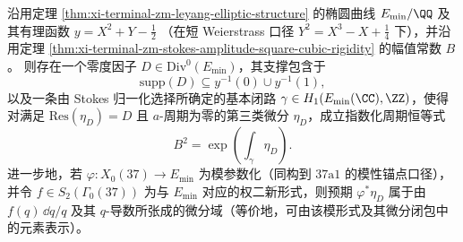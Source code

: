 
\begin{conjecture}\label{conj:xi-terminal-zm-stokes-b2-thirdkind-exponential-period}
沿用定理 \ref{thm:xi-terminal-zm-leyang-elliptic-structure} 的椭圆曲线 \(E_{\min}/\QQ\) 及其有理函数
\(
y= X^{2}+Y-\tfrac12
\)
（在短 Weierstrass 口径 \(Y^{2}=X^{3}-X+\tfrac14\) 下），并沿用定理 \ref{thm:xi-terminal-zm-stokes-amplitude-square-cubic-rigidity} 的幅值常数 \(B\)。
则存在一个零度因子 \(D\in\mathrm{Div}^{0}(E_{\min})\)，其支撑包含于
\[
\mathrm{supp}(D)\subseteq y^{-1}(0)\cup y^{-1}(1),
\]
以及一条由 Stokes 归一化选择所确定的基本闭路 \(\gamma\in H_{1}(E_{\min}(\CC),\ZZ)\)，使得对满足
\(
\mathrm{Res}(\eta_D)=D
\)
且 \(a\)-周期为零的第三类微分 \(\eta_D\)，成立指数化周期恒等式
\[
\boxed{\;
B^{2}=\exp\!\left(\int_{\gamma}\eta_D\right).\;}
\]
进一步地，若 \(\varphi:X_0(37)\to E_{\min}\) 为模参数化（同构到 \(37\mathrm a1\) 的模性锚点口径），并令 \(f\in S_2(\Gamma_0(37))\) 为与 \(E_{\min}\) 对应的权二新形式，则预期 \(\varphi^{*}\eta_D\) 属于由 \(f(q)\,\dd q/q\) 及其 \(q\)-导数所张成的微分域（等价地，可由该模形式及其微分闭包中的元素表示）。
\end{conjecture}

\endinput


